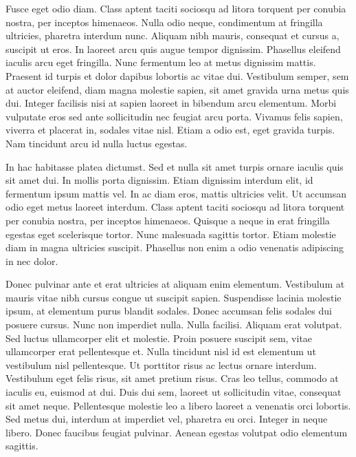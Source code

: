 \documentclass{EPUProjetDi}
\begin{document}
\label{sec:Donec_faucibus}

Fusce eget odio diam. Class aptent taciti sociosqu ad litora torquent per conubia nostra, per inceptos himenaeos. Nulla odio neque, condimentum at fringilla ultricies, pharetra interdum nunc. Aliquam nibh mauris, consequat et cursus a, suscipit ut eros. In laoreet arcu quis augue tempor dignissim. Phasellus eleifend iaculis arcu eget fringilla. Nunc fermentum leo at metus dignissim mattis. Praesent id turpis et dolor dapibus lobortis ac vitae dui. Vestibulum semper, sem at auctor eleifend, diam magna molestie sapien, sit amet gravida urna metus quis dui. Integer facilisis nisi at sapien laoreet in bibendum arcu elementum. Morbi vulputate eros sed ante sollicitudin nec feugiat arcu porta. Vivamus felis sapien, viverra et placerat in, sodales vitae nisl. Etiam a odio est, eget gravida turpis. Nam tincidunt arcu id nulla luctus egestas.

In hac habitasse platea dictumst. Sed et nulla sit amet turpis ornare iaculis quis sit amet dui. In mollis porta dignissim. Etiam dignissim interdum elit, id fermentum ipsum mattis vel. In ac diam eros, mattis ultricies velit. Ut accumsan odio eget metus laoreet interdum. Class aptent taciti sociosqu ad litora torquent per conubia nostra, per inceptos himenaeos. Quisque a neque in erat fringilla egestas eget scelerisque tortor. Nunc malesuada sagittis tortor. Etiam molestie diam in magna ultricies suscipit. Phasellus non enim a odio venenatis adipiscing in nec dolor.

Donec pulvinar ante et erat ultricies at aliquam enim elementum. Vestibulum at mauris vitae nibh cursus congue ut suscipit sapien. Suspendisse lacinia molestie ipsum, at elementum purus blandit sodales. Donec accumsan felis sodales dui posuere cursus. Nunc non imperdiet nulla. Nulla facilisi. Aliquam erat volutpat. Sed luctus ullamcorper elit et molestie. Proin posuere suscipit sem, vitae ullamcorper erat pellentesque et. Nulla tincidunt nisl id est elementum ut vestibulum nisl pellentesque. Ut porttitor risus ac lectus ornare interdum. Vestibulum eget felis risus, sit amet pretium risus. Cras leo tellus, commodo at iaculis eu, euismod at dui. Duis dui sem, laoreet ut sollicitudin vitae, consequat sit amet neque. Pellentesque molestie leo a libero laoreet a venenatis orci lobortis. Sed metus dui, interdum at imperdiet vel, pharetra eu orci. Integer in neque libero. Donec faucibus feugiat pulvinar. Aenean egestas volutpat odio elementum sagittis. 

\end{document}
